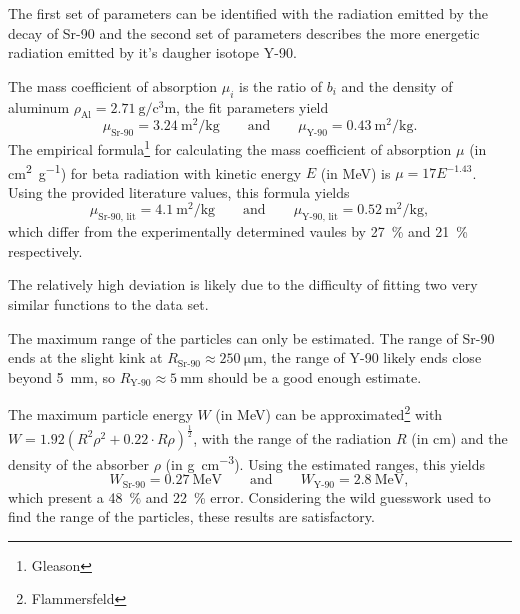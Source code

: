 The first set of parameters can be identified with the radiation emitted by the decay of Sr-90 and the second set of parameters describes the more energetic radiation emitted by it's daugher isotope Y-90.

The mass coefficient of absorption $\mu_i$ is the ratio of $b_i$ and the density of aluminum $\rho_\text{Al} = \SI{2.71}{\gram\per\cubic\centi\meter}$, the fit parameters yield
\begin{equation*}
	\mu_\text{Sr-90} = \SI{3.24}{\meter\squared\per\kilo\gram} \qquad \text{and} \qquad \mu_\text{Y-90} = \SI{0.43}{\meter\squared\per\kilo\gram}.
\end{equation*}
The empirical formula\footnote{Gleason} for calculating the mass coefficient of absorption $\mu$ (in \si{\centi\meter\squared\per\gram}) for beta radiation with kinetic energy $E$ (in \si{\MeV}) is $\mu = 17 E^{-1.43}$.
Using the provided literature values, this formula yields
\begin{equation*}
	\mu_\text{Sr-90, lit} = \SI{4.1}{\meter\squared\per\kilo\gram} \qquad \text{and} \qquad \mu_\text{Y-90, lit} = \SI{0.52}{\meter\squared\per\kilo\gram},
\end{equation*}
which differ from the experimentally determined vaules by \SI{27}{\percent} and \SI{21}{\percent} respectively.

The relatively high deviation is likely due to the difficulty of fitting two very similar functions to the data set.

The maximum range of the particles can only be estimated.
The range of Sr-90 ends at the slight kink at $R_\text{Sr-90} \approx \SI{250}{\um}$, the range of Y-90 likely ends close beyond \SI{5}{\mm}, so $R_\text{Y-90} \approx \SI{5}{\mm}$ should be a good enough estimate.

The maximum particle energy $W$ (in \si{\MeV}) can be approximated\footnote{Flammersfeld} with $W = 1.92\left(R^2\rho^2 + 0.22 \cdot R\rho\right)^\frac{1}{2}$, with the range of the radiation $R$ (in \si{\cm}) and the density of the absorber $\rho$ (in \si{\gram\per\cm\cubed}).
Using the estimated ranges, this yields
\begin{equation*}
	W_\text{Sr-90} = \SI{0.27}{\MeV} \qquad \text{and} \qquad W_\text{Y-90} = \SI{2.8}{\MeV},
\end{equation*}
which present a \SI{48}{\percent} and \SI{22}{\percent} error.
Considering the wild guesswork used to find the range of the particles, these results are satisfactory.
